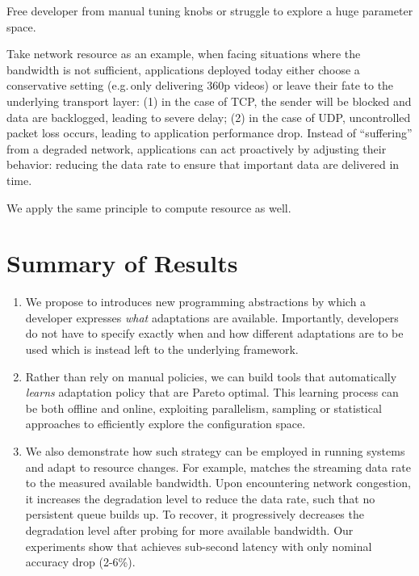 \documentclass[thesis.tex]{subfiles}
\begin{document}
 Free developer from manual tuning
knobs or struggle to explore a huge parameter space.

Take network resource as an example, when facing situations where the bandwidth
is not sufficient, applications deployed today either choose a conservative
setting (e.g.\,only delivering 360p videos) or leave their fate to the
underlying transport layer: (1) in the case of TCP, the sender will be blocked
and data are backlogged, leading to severe delay; (2) in the case of UDP,
uncontrolled packet loss occurs, leading to application performance
drop. Instead of ``suffering'' from a degraded network, applications can act
proactively by adjusting their behavior: reducing the data rate to ensure that
important data are delivered in time.

We apply the same principle to compute resource as well.

\section{Summary of Results}
\label{sec:summary-results-1}

\begin{enumerate}
\item We propose to introduces new programming abstractions by which a developer
  expresses \emph{what} adaptations are available. Importantly, developers do
  not have to specify exactly when and how different adaptations are to be used
  which is instead left to the underlying framework.

\item Rather than rely on manual policies, we can build tools that automatically
  \emph{learns} adaptation policy that are Pareto optimal. This learning process
  can be both offline and online, exploiting parallelism, sampling or
  statistical approaches to efficiently explore the configuration space.

\item We also demonstrate how such strategy can be employed in running systems
  and adapt to resource changes. For example, \sysname{} matches the streaming
  data rate to the measured available bandwidth. Upon encountering network
  congestion, it increases the degradation level to reduce the data rate, such
  that no persistent queue builds up. To recover, it progressively decreases the
  degradation level after probing for more available bandwidth. Our experiments
  show that \sysname{} achieves sub-second latency with only nominal accuracy
  drop (2-6\%).
\end{enumerate}
\end{document}
